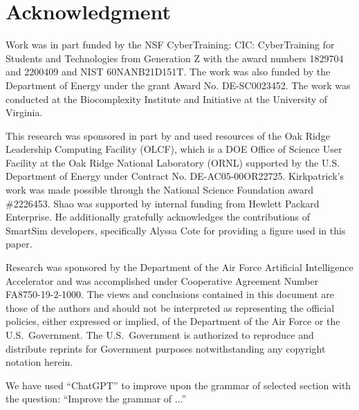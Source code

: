 
\section*{Acknowledgment}


Work was in part funded by the NSF CyberTraining: CIC: CyberTraining for Students and Technologies from Generation Z with the award numbers 1829704 and 2200409 and NIST 60NANB21D151T.  The work was also funded by the Department of Energy under the grant Award No. DE-SC0023452. The work was conducted at the Biocomplexity Institute and Initiative at the University of Virginia.

This research was sponsored in part by and used resources of the Oak Ridge Leadership Computing Facility (OLCF), which is a DOE Office of Science User Facility at the Oak Ridge National Laboratory (ORNL) supported by the U.S. Department of Energy under Contract No. DE-AC05-00OR22725. Kirkpatrick's work was made possible through the National Science Foundation award \#2226453. Shao was supported by internal funding from Hewlett Packard Enterprise. He additionally gratefully acknowledges the contributions of SmartSim developers, specifically Alyssa Cote for providing a figure used in this paper.


\cite{las-2023-mlcommons-edu-eq}

Research was sponsored by the Department of the Air Force Artificial
Intelligence Accelerator and was accomplished under Cooperative
Agreement Number FA8750-19-2-1000. The views and conclusions contained
in this document are those of the authors and should not be interpreted
as representing the official policies, either expressed or implied, of
the Department of the Air Force or the U.S.\ Government. The U.S.\
Government is authorized to reproduce and distribute reprints for
Government purposes notwithstanding any copyright notation herein.
%

We have used ``ChatGPT'' to improve upon the grammar of selected section with the question: ``Improve the grammar of ...''